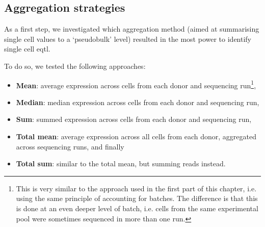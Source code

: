 




\newpage

\subsection{Aggregation strategies}


As a first step, we investigated which aggregation method (aimed at summarising single cell values to a `pseudobulk' level) resulted in the most power to identify single cell \gls{eqtl}.

To do so, we tested the following approaches:

\begin{itemize}
    \item \textbf{Mean}: average expression across cells from each donor and sequencing run\footnote{This is very similar to the approach used in the first part of this chapter, i.e. using the same principle of accounting for batches.
    The difference is that this is done at an even deeper level of batch, i.e. cells from the same experimental pool were sometimes sequenced in more than one run.},
    \item \textbf{Median}: median expression across cells from each donor and sequencing run,
    \item \textbf{Sum}: summed expression across cells from each donor and sequencing run,
    \item \textbf{Total mean}: average expression across all cells from each donor, aggregated across sequencing runs, and finally
    \item \textbf{Total sum}: similar to the total mean, but summing reads instead.
\end{itemize}

